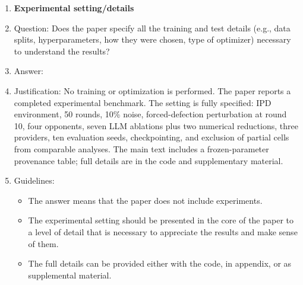 \begin{enumerate}
\item {\bf Experimental setting/details}
    \item[] Question: Does the paper specify all the training and test details (e.g., data splits, hyperparameters, how they were chosen, type of optimizer) necessary to understand the results?
    \item[] Answer: \answerYes{}
    \item[] Justification: No training or optimization is performed. The paper reports a completed experimental benchmark. The setting is fully specified: IPD environment, 50 rounds, 10\% noise, forced-defection perturbation at round 10, four opponents, seven LLM ablations plus two numerical reductions, three providers, ten evaluation seeds, checkpointing, and exclusion of partial cells from comparable analyses. The main text includes a frozen-parameter provenance table; full details are in the code and supplementary material.
    \item[] Guidelines:
    \begin{itemize}
        \item The answer \answerNA{} means that the paper does not include experiments.
        \item The experimental setting should be presented in the core of the paper to a level of detail that is necessary to appreciate the results and make sense of them.
        \item The full details can be provided either with the code, in appendix, or as supplemental material.
    \end{itemize}


\end{enumerate}
